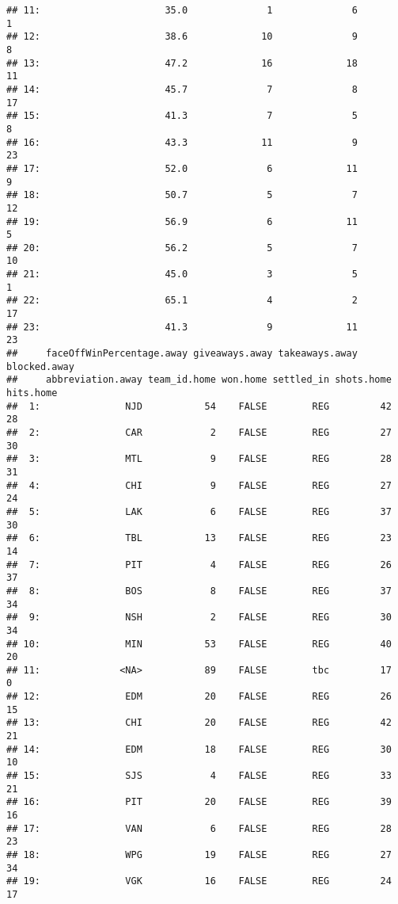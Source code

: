 \documentclass[
]{article}
\begin{document}
\begin{verbatim}
## 11:                      35.0              1              6            1
## 12:                      38.6             10              9            8
## 13:                      47.2             16             18           11
## 14:                      45.7              7              8           17
## 15:                      41.3              7              5            8
## 16:                      43.3             11              9           23
## 17:                      52.0              6             11            9
## 18:                      50.7              5              7           12
## 19:                      56.9              6             11            5
## 20:                      56.2              5              7           10
## 21:                      45.0              3              5            1
## 22:                      65.1              4              2           17
## 23:                      41.3              9             11           23
##     faceOffWinPercentage.away giveaways.away takeaways.away blocked.away
##     abbreviation.away team_id.home won.home settled_in shots.home hits.home
##  1:               NJD           54    FALSE        REG         42        28
##  2:               CAR            2    FALSE        REG         27        30
##  3:               MTL            9    FALSE        REG         28        31
##  4:               CHI            9    FALSE        REG         27        24
##  5:               LAK            6    FALSE        REG         37        30
##  6:               TBL           13    FALSE        REG         23        14
##  7:               PIT            4    FALSE        REG         26        37
##  8:               BOS            8    FALSE        REG         37        34
##  9:               NSH            2    FALSE        REG         30        34
## 10:               MIN           53    FALSE        REG         40        20
## 11:              <NA>           89    FALSE        tbc         17         0
## 12:               EDM           20    FALSE        REG         26        15
## 13:               CHI           20    FALSE        REG         42        21
## 14:               EDM           18    FALSE        REG         30        10
## 15:               SJS            4    FALSE        REG         33        21
## 16:               PIT           20    FALSE        REG         39        16
## 17:               VAN            6    FALSE        REG         28        23
## 18:               WPG           19    FALSE        REG         27        34
## 19:               VGK           16    FALSE        REG         24        17

\end{verbatim}
\end{document}
